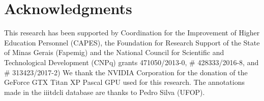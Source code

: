 \documentclass[conference]{IEEEtran}
\begin{document}
\section*{Acknowledgments}

This research has been supported by Coordination for the Improvement of Higher Education Personnel (CAPES), the Foundation for Research Support of the State of Minas Gerais (Fapemig) and the National Council for Scientific and Technological Development (CNPq) grants 471050/2013-0, \# 428333/2016-8, and \# 313423/2017-2)
We thank the NVIDIA Corporation for the donation of the GeForce GTX Titan XP Pascal GPU used for this research. 
The annotations made in the \gls*{iiitdcli} database are thanks to Pedro Silva (UFOP).

\balance


\end{document}
